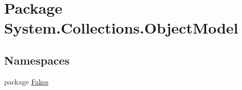 \hypertarget{namespace_system_1_1_collections_1_1_object_model}{\section{Package System.\-Collections.\-Object\-Model}
\label{namespace_system_1_1_collections_1_1_object_model}
}
\subsection*{Namespaces}
\begin{DoxyCompactItemize}
\item 
package \hyperlink{namespace_system_1_1_collections_1_1_object_model_1_1_fakes}{Fakes}
\end{DoxyCompactItemize}
